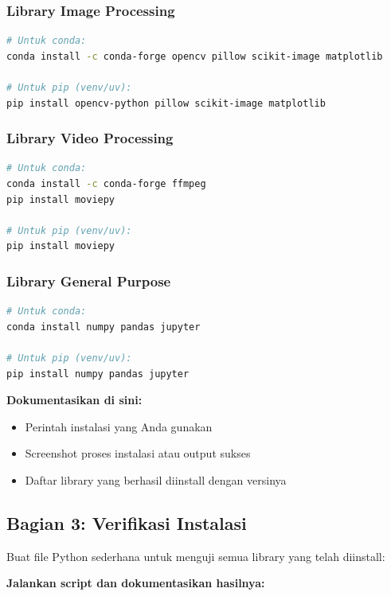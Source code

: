 \documentclass[11pt,a4paper]{article}
\begin{document}
\subsubsection{Library Image Processing}
\begin{lstlisting}[language=bash, caption=Instalasi library image]
# Untuk conda:
conda install -c conda-forge opencv pillow scikit-image matplotlib

# Untuk pip (venv/uv):
pip install opencv-python pillow scikit-image matplotlib
\end{lstlisting}

\subsubsection{Library Video Processing}
\begin{lstlisting}[language=bash, caption=Instalasi library video]
# Untuk conda:
conda install -c conda-forge ffmpeg
pip install moviepy

# Untuk pip (venv/uv):
pip install moviepy
\end{lstlisting}

\subsubsection{Library General Purpose}
\begin{lstlisting}[language=bash, caption=Instalasi library umum]
# Untuk conda:
conda install numpy pandas jupyter

# Untuk pip (venv/uv):
pip install numpy pandas jupyter
\end{lstlisting}

\textbf{Dokumentasikan di sini:}
\begin{itemize}
    \item Perintah instalasi yang Anda gunakan
    \item Screenshot proses instalasi atau output sukses
    \item Daftar library yang berhasil diinstall dengan versinya
\end{itemize}

\subsection{Bagian 3: Verifikasi Instalasi}
Buat file Python sederhana untuk menguji semua library yang telah diinstall:


\textbf{Jalankan script dan dokumentasikan hasilnya:}
\end{document}

